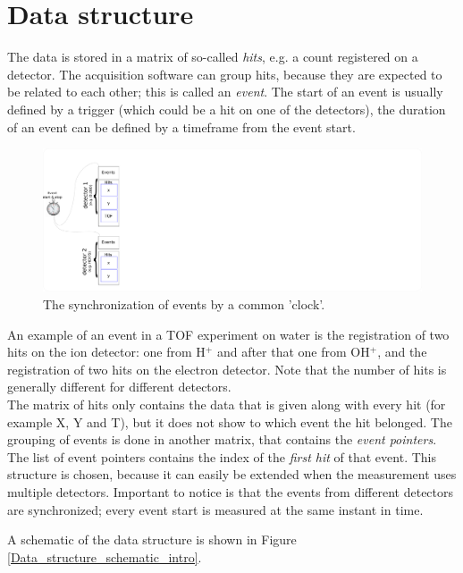 \section{Data structure}
The data is stored in a matrix of so-called \emph{hits}, e.g. a count registered on a detector. The acquisition software can group hits, because they are expected to be related to each other; this is called an \emph{event}. The start of an event is usually defined by a trigger (which could be a hit on one of the detectors), the duration of an event can be defined by a timeframe from the event start.

\begin{figure}[h]
   \centering
    \centerline{\includegraphics[width=1\textwidth]{Graphics/synchronization.pdf}}
\caption{The synchronization of events by a common 'clock'.}
\label{event_synchronization}
\end{figure}

An example of an event in a TOF experiment on water is the registration of two hits on the ion detector: one from H$^+$ and after that one from OH$^+$, and the registration of two hits on the electron detector. Note that the number of hits is generally different for different detectors.
\\
The matrix of hits only contains the data that is given along with every hit (for example X, Y and T), but it does not show to which event the hit belonged. The grouping of events is done in another matrix, that contains the \emph{event pointers}. The list of event pointers contains the index of the \emph{first hit} of that event. 
This structure is chosen, because it can easily be extended when the measurement uses multiple detectors.
Important to notice is that the events from different detectors are synchronized; every event start is measured at the same instant in time. 

A schematic of the data structure is shown in Figure \ref{Data_structure_schematic_intro}.


